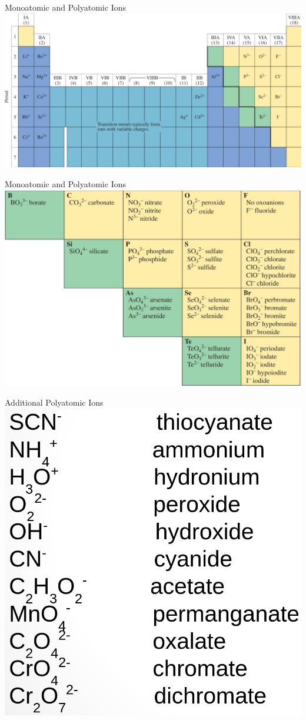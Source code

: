 \documentclass[11pt]{beamer}
\begin{document}
\begin{frame}{Monoatomic and Polyatomic Ions}
  \centering
  \includegraphics[width=\linewidth]{monoatomic_ion}
\end{frame}

\begin{frame}{Monoatomic and Polyatomic Ions}
  \centering
  \includegraphics[width=\linewidth]{polyatomic_ion}
\end{frame}

\begin{frame}{Additional Polyatomic Ions}
  \centering
  \includegraphics[width=0.7\linewidth]{more_poly_ions}
\end{frame}
\end{document}
